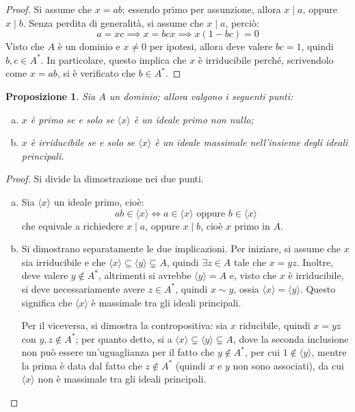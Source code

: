 \documentclass[11pt]{article}
\theoremstyle{style}
\newtheorem{prop}{Proposizione}[section]
\numberwithin{equation}{subsection}
\begin{document}
	\begin{proof}
	Si assume che $x = ab$; essendo primo per assunzione, allora $x \mid a$, oppure $x  \mid b$.
	Senza perdita di generalit\`a, si assume che $x  \mid a$, perci\`o:
	\[
	a = xc \implies x= bcx\implies x(1-bc) = 0
	\] 
	Visto che $A$ \`e un dominio e $x \neq 0$ per ipotesi, allora deve valere $bc = 1$, quindi $b,c \in A^*$.
	In particolare, questo implica che $x$ \`e irriducibile perch\'e, scrivendolo come $x = ab$, si \`e verificato che $b \in A^*$.
	\end{proof}
\begin{prop}\label{prid}
	Sia $A$ un dominio; allora valgono i seguenti punti:
	\begin{enumerate}[(a).]
		\item $x$ \`e primo se e solo se $\langle x \rangle$ \`e un ideale primo non nullo;
		\item $x$ \`e irriducibile se e solo se $\langle x \rangle$ \`e un ideale massimale nell'insieme degli ideali principali.
	\end{enumerate}
\end{prop}
	\begin{proof}
		Si divide la dimostrazione nei due punti.
		\begin{enumerate}[(a).]
			\item Sia $\langle x \rangle$ un ideale primo, cio\`e:
		\[
		ab \in \langle x \rangle \iff a \in \langle x \rangle \text{ oppure } b \in \langle x \rangle
		\] 
		che equivale a richiedere $x  \mid a$, oppure $x \mid b$, cio\`e $x$ primo in $A$.
	\item Si dimostrano separatamente le due implicazioni.
Per iniziare, si assume che $x$ sia irriducibile e che $\langle x \rangle\subseteq \langle y \rangle\subsetneq A$, quindi $\exists z \in A$ tale che $x = yz$. 
Inoltre, deve valere $y \not\in A^*$, altrimenti si avrebbe $\langle y \rangle= A$ e, visto che $x$ \`e irriducibile, si deve necessariamente avere $z \in A^*$, quindi $x\sim y$, ossia $\langle x \rangle = \langle y \rangle$.
Questo significa che $\langle x \rangle$ \`e massimale tra gli ideali principali.

Per il viceversa, si dimostra la contropositiva: sia $x$ riducibile, quindi $x = yz$ con $y,z \not \in A^*$; per quanto detto, si a $\langle x \rangle\subsetneq \langle y \rangle\subsetneq A$, dove la seconda inclusione non pu\`o essere un'uguaglianza per il fatto che $y\not \in A^*$, per cui $1\not \in \langle y \rangle$, mentre la prima \`e data dal fatto che $z \not \in A^*$ (quindi $x$ e $y$ non sono associati), da cui $\langle x \rangle$ non \`e massimale tra gli ideali principali.
		\end{enumerate}
	\end{proof}
\end{document}
